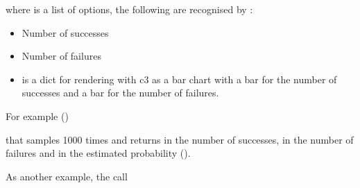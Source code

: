 \documentclass[letterpaper,10pt,english]{sphinxmanual}
\begin{document}
\sphinxAtStartPar
where  is a list of options, the following are recognised by :
\begin{itemize}
\item {} 
\sphinxAtStartPar
{} Number of successes

\item {} 
\sphinxAtStartPar
{} Number of failures

\item {} 
\sphinxAtStartPar
{}  is a dict for rendering with c3 as a bar chart with a bar for the number of successes and a bar for the number of failures.

\end{itemize}

\sphinxAtStartPar
For example ()

\begin{sphinxVerbatim}[commandchars=\\\{\}]
 \PYG{p}{[}\PYG{p}{]}
\end{sphinxVerbatim}

\sphinxAtStartPar
that samples  1000 times and returns in  the number of successes, in  the number of failures and in  the estimated probability ().

\sphinxAtStartPar
As another example, the call

\begin{sphinxVerbatim}[commandchars=\\\{\}]
 
\end{sphinxVerbatim}
\end{document}
